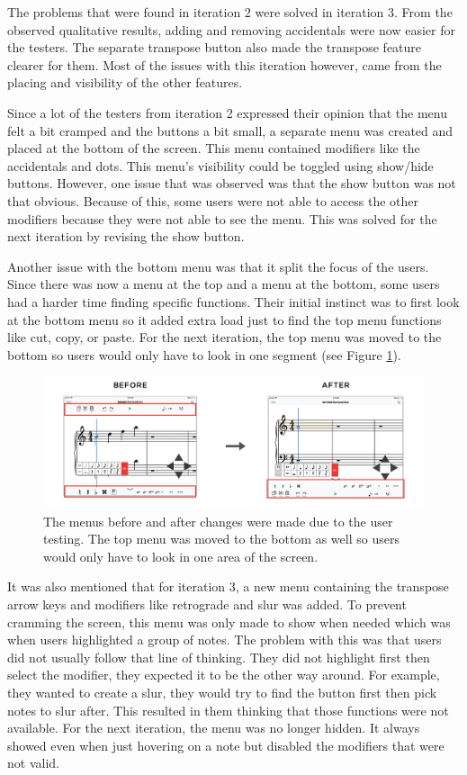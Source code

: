 			The problems that were found in iteration 2 were solved in iteration 3. From the observed qualitative results, adding and removing accidentals were now easier for the testers. The separate transpose button also made the transpose feature clearer for them. Most of the issues with this iteration however, came from the placing and visibility of the other features. 

			Since a lot of the testers from iteration 2 expressed their opinion that the menu felt a bit cramped and the buttons a bit small, a separate menu was created and placed at the bottom of the screen. This menu contained modifiers like the accidentals and dots. This menu's visibility could be toggled using show/hide buttons. However, one issue that was observed was that the show button was not that obvious. Because of this, some users were not able to access the other modifiers because they were not able to see the menu. This was solved for the next iteration by revising the show button. 

			Another issue with the bottom menu was that it split the focus of the users. Since there was now a menu at the top and a menu at the bottom, some users had a harder time finding specific functions. Their initial instinct was to first look at the bottom menu so it added extra load just to find the top menu functions like cut, copy, or paste. For the next iteration, the top menu was moved to the bottom so users would only have to look in one segment (see Figure \ref{fig:before-after-menu}). 

			\begin{figure}[h]
				\centering
				\includegraphics[scale=0.25]{figures/before-after-menu}
			    \caption{The menus before and after changes were made due to the user testing. The top menu was moved to the bottom as well so users would only have to look in one area of the screen.}
			    \label{fig:before-after-menu}
			\end{figure}

			It was also mentioned that for iteration 3, a new menu containing the transpose arrow keys and modifiers like retrograde and slur was added. To prevent cramming the screen, this menu was only made to show when needed which was when users highlighted a group of notes. The problem with this was that users did not usually follow that line of thinking. They did not highlight first then select the modifier, they expected it to be the other way around. For example, they wanted to create a slur, they would try to find the button first then pick notes to slur after. This resulted in them thinking that those functions were not available. For the next iteration, the menu was no longer hidden. It always showed even when just hovering on a note but disabled the modifiers that were not valid. 

